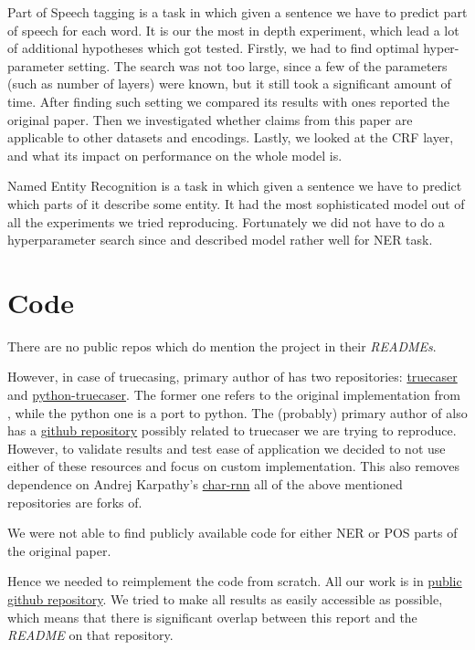 \documentclass[11pt,a4paper]{article}
\begin{document}
Part of Speech tagging is a task in which given a sentence we have to predict part of speech for each word. It is our the most in depth experiment, which lead a lot of additional hypotheses which got tested. Firstly, we had to find optimal hyper-parameter setting. The search was not too large, since a few of the parameters (such as number of layers) were known, but it still took a significant amount of time. After finding such setting we compared its results with ones reported the original paper. Then we investigated whether claims from this paper are applicable to other datasets and encodings. Lastly, we looked at the CRF layer, and what its impact on performance on the whole model is.

Named Entity Recognition is a task in which given a sentence we have to predict which parts of it describe some entity. It had the most sophisticated model out of all the experiments we tried reproducing. Fortunately we did not have to do a hyperparameter search since \cite{ner-and-pos-original} and \cite{ma-hovy-2016-end} described model rather well for NER task.

\section{Code}
There are no public repos which do mention the project in their \textit{READMEs}.

However, in case of truecasing, primary author of \cite{ner-and-pos-original} has two repositories: \href{https://github.com/mayhewsw/truecaser}{truecaser} and \href{https://github.com/mayhewsw/pytorch-truecaser}{python-truecaser}. The former one refers to the original implementation from \cite{susanto-etal-2016-learning}, while the python one is a port to python. The (probably) primary author of \cite{susanto-etal-2016-learning} also has a \href{https://github.com/raymondhs/char-rnn-truecase}{github repository} possibly related to truecaser we are trying to reproduce. However, to validate results and test ease of application we decided to not use either of these resources and focus on custom implementation. This also removes dependence on Andrej Karpathy's \href{https://github.com/karpathy/char-rnn}{char-rnn} all of the above mentioned repositories are forks of.

We were not able to find publicly available code for either NER or POS parts of the original paper.

Hence we needed to reimplement the code from scratch. All our work is in \href{https://github.com/andreaskuster/uw-nlp}{public github repository}. We tried to make all results as easily accessible as possible, which means that there is significant overlap between this report and the \textit{README} on that repository.
\end{document}
